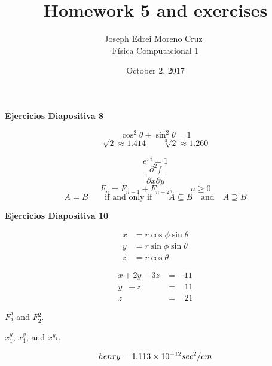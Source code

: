 \documentclass{article}
\title{Homework 5 and exercises}
\author{Joseph Edrei Moreno Cruz~\\ 
F\'isica Computacional 1}
\date{October 2, 2017}
\begin{document}
\maketitle
\begin{center}
\textbf{Ejercicios Diapositiva 8}
\end{center} \par
\begin{displaymath}
\cos^2{\theta} + \sin^2{\theta} = 1
\end{displaymath}
$$\sqrt{2}\approx{1.414}{}\qquad{}\sqrt[3]{2}\approx{1.260}$$

\begin{displaymath}
e^{\pi{}i} = 1
\end{displaymath}
\begin{displaymath}
\frac{\partial^2 f}{\partial x {} \partial y}
\end{displaymath}
\begin{displaymath}
F_{n} = F_{n-1}+F_{n-2}, 
\qquad
n\geq{0}
\end{displaymath}
\begin{displaymath}
A = B \qquad \text{if and only if} \qquad A\subseteq{B} \quad \text{and} \quad A\supseteq{B}
\end{displaymath}
\begin{center}
\textbf{Ejercicios Diapositiva 10}
\end{center} \par
\begin{text}

\end{text}
\begin{align*}
x &= r\cos{\phi}\sin{\theta} \\
y &= r\sin{\phi}\sin{\theta} \\
z &= r\cos{\theta}
\end{align*} \par
\begin{align*}
x+2y-3z &= -11 \\
y \; \; +z &= \; \; \; 11 \\
z &= \; \; \; 21
\end{align*} \par
\begin{center}
$F_{2}^{2}$ and $F{}_{2}^{2}$. \par
$x_{1}^{y}$, $x^{y}_{1}$, and $x^{y_{1}}$.\par

\end{center}
\begin{equation*}
\mathnormal{henry} = 1.113 \times 10^{-12}sec^{2}/cm
\end{equation*}
\end{document}
